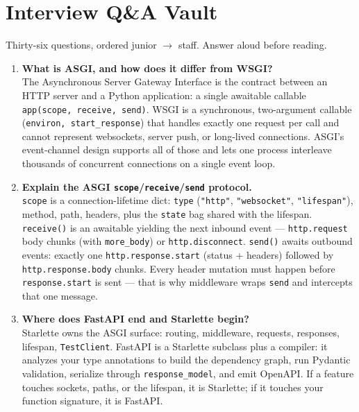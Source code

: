 \section{Interview Q\&A Vault}
\label{sec:ch6-interview}

Thirty-six questions, ordered junior $\to$ staff. Answer aloud before
reading.

\begin{enumerate}[label=\textbf{Q\arabic*.}, leftmargin=1.3cm, itemsep=0.8em]

\item \textbf{What is ASGI, and how does it differ from WSGI?}\\
The Asynchronous Server Gateway Interface is the contract between an HTTP
server and a Python application: a single awaitable callable
\texttt{app(scope, receive, send)}. WSGI is a synchronous, two-argument
callable (\texttt{environ, start\_response}) that handles exactly one
request per call and cannot represent websockets, server push, or
long-lived connections. ASGI's event-channel design supports all of those
and lets one process interleave thousands of concurrent connections on a
single event loop.

\item \textbf{Explain the ASGI \texttt{scope}/\texttt{receive}/\texttt{send}
protocol.}\\
\texttt{scope} is a connection-lifetime dict: \texttt{type}
(\texttt{"http"}, \texttt{"websocket"}, \texttt{"lifespan"}), method, path,
headers, plus the \texttt{state} bag shared with the lifespan.
\texttt{receive()} is an awaitable yielding the next inbound event ---
\texttt{http.request} body chunks (with \texttt{more\_body}) or
\texttt{http.disconnect}. \texttt{send()} awaits outbound events: exactly one
\texttt{http.response.start} (status + headers) followed by
\texttt{http.response.body} chunks. Every header mutation must happen before
\texttt{response.start} is sent --- that is why middleware wraps
\texttt{send} and intercepts that one message.

\item \textbf{Where does FastAPI end and Starlette begin?}\\
Starlette owns the ASGI surface: routing, middleware, requests, responses,
lifespan, \texttt{TestClient}. FastAPI is a Starlette subclass plus a
compiler: it analyzes your type annotations to build the dependency graph,
run Pydantic validation, serialize through \texttt{response\_model}, and
emit OpenAPI. If a feature touches sockets, paths, or the lifespan, it is
Starlette; if it touches your function signature, it is FastAPI.


\end{enumerate}
